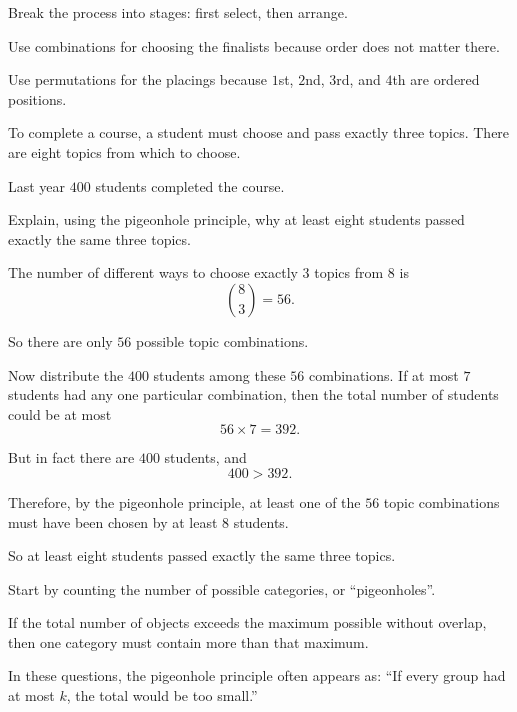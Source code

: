 \begin{takeaways}
\item Break the process into stages: first select, then arrange.
\item Use combinations for choosing the finalists because order does not matter there.
\item Use permutations for the placings because $1$st, $2$nd, $3$rd, and $4$th are ordered positions.
\end{takeaways}

\begin{problem}
To complete a course, a student must choose and pass exactly three topics. There are eight topics from which to choose.

Last year $400$ students completed the course.

Explain, using the pigeonhole principle, why at least eight students passed exactly the same three topics.
\end{problem}

\begin{solution}
The number of different ways to choose exactly $3$ topics from $8$ is
\[
\binom{8}{3} = 56.
\]

So there are only $56$ possible topic combinations.

Now distribute the $400$ students among these $56$ combinations. If at most $7$ students had any one particular combination, then the total number of students could be at most
\[
56\times 7 = 392.
\]

But in fact there are $400$ students, and
\[
400 > 392.
\]

Therefore, by the pigeonhole principle, at least one of the $56$ topic combinations must have been chosen by at least $8$ students.

So at least eight students passed exactly the same three topics.
\end{solution}

\begin{takeaways}
\item Start by counting the number of possible categories, or ``pigeonholes''.
\item If the total number of objects exceeds the maximum possible without overlap, then one category must contain more than that maximum.
\item In these questions, the pigeonhole principle often appears as: ``If every group had at most $k$, the total would be too small.'' 
\end{takeaways}

